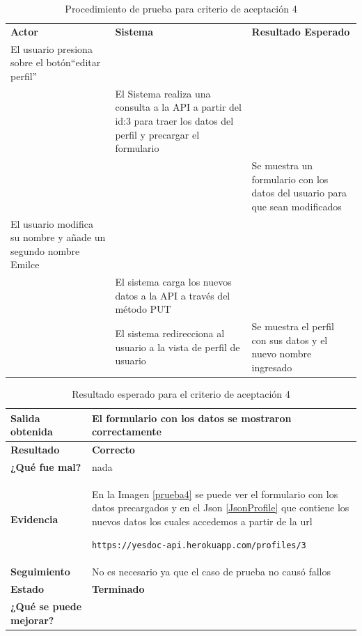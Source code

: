     {\scriptsize
	\begin{table}[h]
    \centering
	\begin{longtable}{|p{5cm}|p{5cm}|p{4cm}|}
	    \hline \hline \rowcolor[gray]{0.9}
        \multicolumn{3}{||l|}{\textbf{Procedimiento de Prueba - ``Editar perfil''}} \\
        \hline 
        \rowcolor[gray]{0.9}
	    \textbf{Actor} & \textbf{Sistema}& \textbf{Resultado Esperado} \\  \hline
	   El usuario presiona sobre el botón``editar perfil'' & & \\ \hline
        & El Sistema realiza una consulta a la API a partir del id:3 para traer los datos del perfil y precargar el formulario &   \\ \hline
        & &  Se muestra un formulario con los datos del usuario para que sean modificados\\ \hline
        El usuario modifica su nombre y añade un segundo nombre Emilce&& \\ \hline
        &El sistema carga los nuevos datos a la API a través del método PUT&\\ \hline
        &El sistema redirecciona al usuario a la vista de perfil de usuario&Se muestra el perfil con sus datos y el nuevo nombre ingresado\\ \hline
	    \end{longtable}
        \caption{Procedimiento de prueba para criterio de aceptación 4}
    	\end{table}
    }
    
    {\scriptsize
	\begin{table}[h]
	\centering
	\begin{tabular}{|l|p{10cm}|}
	    \hline 
	    \textbf{Salida obtenida}& El formulario con los datos se mostraron correctamente\\ \hline
	    \textbf{Resultado}& \textbf{Correcto}\\ \hline
        \textbf{¿Qué fue mal?}& nada\\ \hline      
        \textbf{Evidencia}& En la Imagen \ref{prueba4} se puede ver el formulario con los datos precargados y en el Json \ref{JsonProfile} que contiene los nuevos datos los cuales accedemos a partir de la url \begin{lstlisting} 
https://yesdoc-api.herokuapp.com/profiles/3 \end{lstlisting}\\ \hline
        \textbf{Seguimiento}& No es necesario ya que el caso de prueba no causó
fallos
\\ \hline
        \textbf{Estado}& \textbf{Terminado}\\ \hline        
        \textbf{¿Qué se puede mejorar?}& \\ \hline              
	    \end{tabular}
        \caption{Resultado esperado para el criterio de aceptación 4}
    	\end{table}
	}
\clearpage

